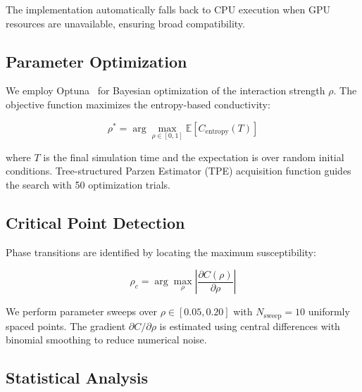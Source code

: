 The implementation automatically falls back to CPU execution when GPU resources 
are unavailable, ensuring broad compatibility.

\subsection{Parameter Optimization}

We employ Optuna~\cite{optuna2019} for Bayesian optimization of the interaction 
strength $\rho$. The objective function maximizes the entropy-based conductivity:

\begin{equation}
\rho^* = \arg\max_{\rho \in [0,1]} \mathbb{E}[C_{\text{entropy}}(T)]
\label{eq:optuna_objective}
\end{equation}

where $T$ is the final simulation time and the expectation is over random 
initial conditions. Tree-structured Parzen Estimator (TPE) acquisition function 
guides the search with 50 optimization trials.

\subsection{Critical Point Detection}

Phase transitions are identified by locating the maximum susceptibility:

\begin{equation}
\rho_c = \arg\max_{\rho} \left|\frac{\partial C(\rho)}{\partial \rho}\right|
\label{eq:critical_detection}
\end{equation}

We perform parameter sweeps over $\rho \in [0.05, 0.20]$ with $N_{\text{sweep}}=10$ 
uniformly spaced points. The gradient $\partial C/\partial \rho$ is estimated 
using central differences with binomial smoothing to reduce numerical noise.

\subsection{Statistical Analysis}


